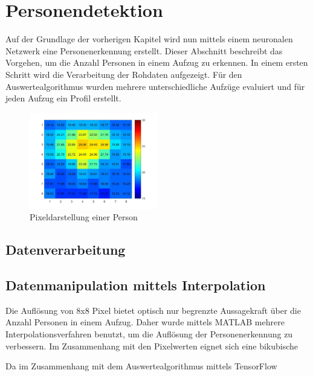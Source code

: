 \chapter{Personendetektion}
\label{chap:Personendetektion}

Auf der Grundlage der vorherigen Kapitel wird nun mittels einem neuronalen Netzwerk eine Personenerkennung erstellt. Dieser Abschnitt beschreibt das Vorgehen, um die Anzahl Personen in einem Aufzug zu erkennen. In einem ersten Schritt wird die Verarbeitung der Rohdaten aufgezeigt. Für den Auswertealgorithmus wurden mehrere unterschiedliche Aufzüge evaluiert und für jeden Aufzug ein Profil erstellt. 



\begin{figure}[H]
	\centering
	\includegraphics[width=0.5\textwidth]
	{fig/person_175_shirt.jpg}
	\caption[Pixeldarstellung einer Person]{Pixeldarstellung einer Person}
	\label{fig:Pixelbild}
\end{figure}



\section{Datenverarbeitung}




\section{Datenmanipulation mittels Interpolation}

Die Auflösung von 8x8 Pixel bietet optisch nur begrenzte Aussagekraft über die Anzahl Personen in einem Aufzug. Daher wurde mittels MATLAB mehrere Interpolationsverfahren benutzt, um die Auflösung der Personenerkennung zu verbessern. Im Zusammenhang mit den Pixelwerten eignet sich eine bikubische



Da im Zusammenhang mit dem Auswertealgorithmus mittels TensorFlow


